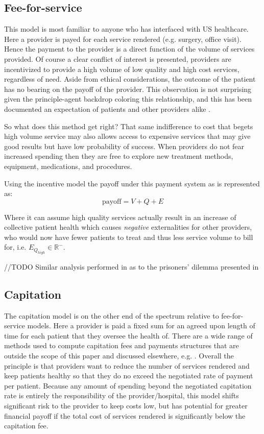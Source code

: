 \documentclass{article}
\begin{document}
\subsection{Fee-for-service}
This model is most familiar to anyone who has interfaced with US healthcare. Here a provider is payed for each service rendered (e.g. surgery, office visit). Hence the payment to the provider is a direct function of the volume of services provided. Of course a clear conflict of interest is presented, providers are incentivized to provide a high volume of low quality and high cost services, regardless of need. Aside from ethical considerations, the outcome of the patient has no bearing on the payoff of the provider. This observation is not surprising given the principle-agent backdrop coloring this relationship, and this has been documented an expectation of patients and other providers alike \cite{econharvard}\cite{overtreat}.

So what does this method get right? That same indifference to cost that begets high volume service may also allows access to expensive services that may give good results but have low probability of success. When providers do not fear increased spending then they are free to explore new treatment methods, equipment, medications, and procedures.

Using the incentive model the payoff under this payment system as is represented as:
\begin{equation}
    \text{payoff} = V + Q + E
\end{equation}

Where it can assume high quality services actually result in an increase of collective patient health which causes \emph{negative} externalities for other providers, who would now have fewer patients to treat and thus less service volume to bill for, i.e. $E_{Q_{high}} \in \mathbb{R}^-$.

//TODO
Similar analysis performed in \cite{blended} as to the prisoners' dilemma presented in 

\subsection{Capitation} \label{sec:capitation}
The capitation model is on the other end of the spectrum relative to fee-for-service models. Here a provider is paid a fixed sum for an agreed upon length of time for each patient that they oversee the health of. There are a wide range of methods used to compute capitation fees and payments structures that are outside the scope of this paper and discussed elsewhere, e.g. \cite{capfees}. Overall the principle is that providers want to reduce the number of services rendered and keep patients healthy so that they do no exceed the negotiated rate of payment per patient. Because any amount of spending beyond the negotiated capitation rate is entirely the responsibility of the provider/hospital, this model shifts significant risk to the provider to keep costs low, but has potential for greater financial payoff if the total cost of services rendered is significantly below the capitation fee.
\end{document}
